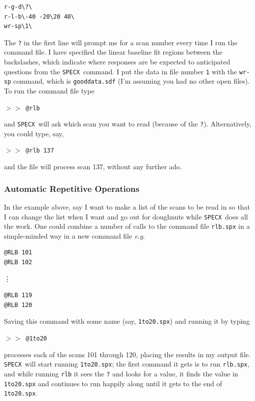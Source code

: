 \documentclass[11pt,twoside]{article}
\newcommand{\eg}{{\it e.g.}}
\newcommand{\SPECX}{{\tt SPECX}}
\newcommand{\SP}{{$>\!>$}}
\begin{document}
\begin{verbatim}
r-g-d\?\
r-l-b\-40 -20\20 40\
wr-sp\1\
\end{verbatim}

The {\tt ?} in the first line will prompt me for a scan number every
time I run the command file. I have specified the linear baseline fit
regions between the backslashes, which indicate where responses are be
expected to
anticipated questions from the
\SPECX\ command. I put the data in file number {\tt 1} with the {\tt wr-sp}
command, which is {\tt gooddata.sdf} (I'm assuming you had no other open
files). To run the command file type

\SP\ \verb|@rlb|

and \SPECX\ will ask which scan you want to read (because of the {\tt ?}).
Alternatively, you could type, say,

\SP\ \verb|@rlb 137|

and the file will process scan 137, without any further ado.

\subsubsection{Automatic Repetitive Operations}
\label{sec:specx_9.3}
In the example above, say I want to make a list of the scans to be
read in so that I can change the list when I want and go out for
doughnuts while \SPECX\ does all the work.  One could combine a number
of calls to the command file {\tt rlb.spx} in a simple-minded way in a
new command file \eg\

\begin{verbatim}
@RLB 101
@RLB 102
\end{verbatim}
\vspace*{-0.1in}
\vdots
\vspace*{-0.1in}
\begin{verbatim}
@RLB 119
@RLB 120
\end{verbatim}

Saving this command with some name (say, {\tt 1to20.spx}) and running it
by typing

\SP\ {\tt @1to20}

processes each of the scans 101 through 120, placing the results in my
output file. \SPECX\ will start running {\tt 1to20.spx}; the first command
it gets is to run {\tt rlb.spx}, and while running {\tt rlb} it sees
the {\tt ?} and looks for a value, it finds the value in {\tt
1to20.spx} and continues to run happily along until it gets to the end
of {\tt 1to20.spx}.
\end{document}
